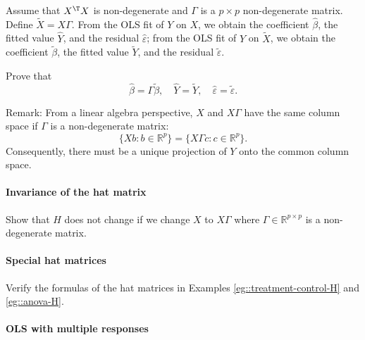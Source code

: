 Assume that $X^{\T} X$ is non-degenerate and $\Gamma$ is a $p\times p$ non-degenerate matrix. Define $\tilde{X}=X\Gamma$. 
From the OLS fit of $Y$ on $X$, we obtain the coefficient $\hat{\beta}$, the fitted value $\hat{Y}$, and the residual $\hat{\varepsilon}$; from the OLS fit of $Y$ on $\tilde{X}$, we obtain the coefficient $\tilde{\beta}$, the fitted value $\tilde{Y}$, and the residual $\tilde{\varepsilon}$. 

Prove that
$$
\hat{\beta} = \Gamma \tilde{\beta},\quad
\hat{Y} = \tilde{Y},\quad 
\hat{\varepsilon} = \tilde{\varepsilon}. 
$$



Remark: From a linear algebra perspective, $X$ and $X\Gamma$ have the same column space if $\Gamma$ is a non-degenerate matrix:
$$ 
\{   Xb : b\in\mathbb{R}^p \} = \{   X\Gamma c : c\in\mathbb{R}^p \} .
$$
Consequently, there must be a unique projection of $Y$ onto the common column space.  



\paragraph{Invariance of the hat matrix}\label{hw03::invariance-of-H}

Show that $H$ does not change if we change $X$ to $X\Gamma$ where $\Gamma \in \mathbb{R}^{p\times p}$ is a non-degenerate matrix.  


\paragraph{Special hat matrices}\label{hw03::special-H}

Verify the formulas of the hat matrices in Examples \ref{eg::treatment-control-H} and \ref{eg::anova-H}. 




\paragraph{OLS with multiple responses}
\label{hw03::multiple-responses}
 
